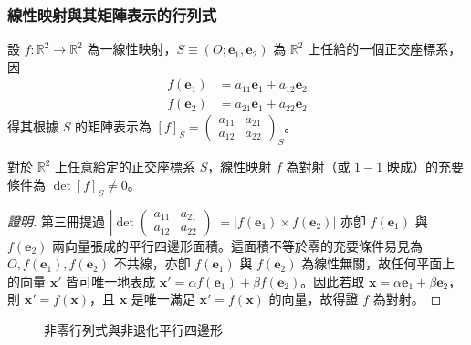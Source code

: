 \subsubsection*{線性映射與其矩陣表示的行列式}

設 $f: \mathbb{R}^2 \to \mathbb{R}^2$ 為一線性映射，$S \equiv (O; \mathbf{e}_1, \mathbf{e}_2)$ 為 $\mathbb{R}^2$ 上任給的一個正交座標系，因
\begin{align*}
f(\mathbf{e}_1) &= a_{11}\mathbf{e}_1 + a_{12}\mathbf{e}_2 \\
f(\mathbf{e}_2) &= a_{21}\mathbf{e}_1 + a_{22}\mathbf{e}_2
\end{align*}
得其根據 $S$ 的矩陣表示為 $[f]_S = \begin{pmatrix} a_{11} & a_{21} \\ a_{12} & a_{22} \end{pmatrix}_S$。

\begin{theorem}[定理 5]
對於 $\mathbb{R}^2$ 上任意給定的正交座標系 $S$，線性映射 $f$ 為對射（或 $1-1$ 映成）的充要條件為 $\det[f]_S \neq 0$。
\end{theorem}

\begin{proof}[證明]
第三冊提過 $\left|\det \begin{pmatrix} a_{11} & a_{21} \\ a_{12} & a_{22} \end{pmatrix}\right| = |f(\mathbf{e}_1) \times f(\mathbf{e}_2)|$ 亦卽 $f(\mathbf{e}_1)$ 與 $f(\mathbf{e}_2)$ 兩向量張成的平行四邊形面積。這面積不等於零的充要條件易見為 $O, f(\mathbf{e}_1), f(\mathbf{e}_2)$ 不共線，亦卽 $f(\mathbf{e}_1)$ 與 $f(\mathbf{e}_2)$ 為線性無關，故任何平面上的向量 $\mathbf{x}'$ 皆可唯一地表成 $\mathbf{x}' = \alpha f(\mathbf{e}_1) + \beta f(\mathbf{e}_2)$。因此若取 $\mathbf{x} = \alpha\mathbf{e}_1 + \beta\mathbf{e}_2$，則 $\mathbf{x}' = f(\mathbf{x})$，且 $\mathbf{x}$ 是唯一滿足 $\mathbf{x}' = f(\mathbf{x})$ 的向量，故得證 $f$ 為對射。
\end{proof}

\begin{figure}[H]
\centering
{}
\caption{非零行列式與非退化平行四邊形}
\label{fig:b4s-1-3-9}
\end{figure}

